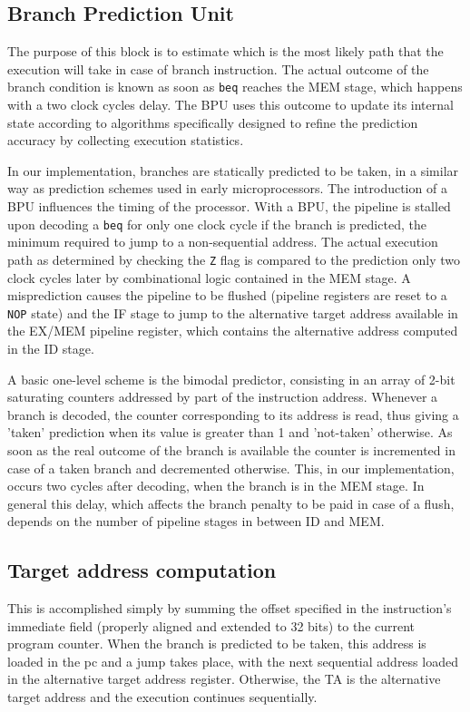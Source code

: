 \subsection{Branch Prediction Unit} The purpose of this block is to estimate which is the most likely path that the execution will take in case of branch instruction. The actual outcome of the branch condition is known as soon as \texttt{beq} reaches the MEM stage, which happens with a two clock cycles delay. The BPU uses this outcome to update its internal state according to algorithms specifically designed to refine the prediction accuracy by collecting execution statistics.

In our implementation, branches are statically predicted to be taken, in a similar way as prediction schemes used in early microprocessors. The introduction of a BPU influences the timing of the processor. With a BPU, the pipeline is stalled upon decoding a \texttt{beq} for only one clock cycle if the branch is predicted, the minimum required to jump to a non-sequential address. The actual execution path as determined by checking the \texttt{Z} flag is compared to the prediction only two clock cycles later by combinational logic contained in the MEM stage. A misprediction causes the pipeline to be flushed (pipeline registers are reset to a \texttt{NOP} state) and the IF stage to jump to the alternative target address available in the EX/MEM pipeline register, which contains the alternative address computed in the ID stage.

A basic one-level scheme is the bimodal predictor, consisting in an array of 2-bit saturating counters addressed by part of the instruction address. Whenever a branch is decoded, the counter corresponding to its address is read, thus giving a 'taken' prediction when its value is greater than 1 and 'not-taken' otherwise. As soon as the real outcome of the branch is available the counter is incremented in case of a taken branch and decremented otherwise. This, in our implementation, occurs two cycles after decoding, when the branch is in the MEM stage. In general this delay, which affects the branch penalty to be paid in case of a flush, depends on the number of pipeline stages in between ID and MEM.


\subsection{Target address computation} This is accomplished simply by summing the offset specified in the instruction's immediate field (properly aligned and extended to 32 bits) to the current program counter. When the branch is predicted to be taken, this address is loaded in the pc and a jump takes place, with the next sequential address loaded in the alternative target address register. Otherwise, the TA is the alternative target address and the execution continues sequentially.

